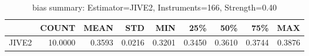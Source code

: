 \begin{table}[ht]
\centering
\caption{bias summary: Estimator=JIVE2, Instruments=166, Strength=0.40}
\begin{tabular}{lrrrrrrrr}
\toprule
 & COUNT & MEAN & STD & MIN & 25\% & 50\% & 75\% & MAX \\
\midrule
JIVE2 & 10.0000 & 0.3593 & 0.0216 & 0.3201 & 0.3450 & 0.3610 & 0.3744 & 0.3876 \\
\bottomrule
\end{tabular}
\end{table}
